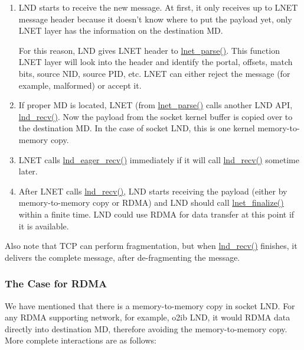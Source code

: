 \begin{enumerate}

\item LND starts to receive the new message. At first, it only receives up to LNET
message header because it doesn't know where to put the payload yet, only LNET
layer has the information on the destination MD.

For this reason, LND gives LNET header to \url{lnet_parse()}. This function
LNET layer will look into the header and identify the portal, offsets,
match bits, source NID, source PID, etc. LNET can either reject the message (for
example, malformed) or accept it.

\item If proper MD is located, LNET (from \url{lnet_parse()} calls another
LND API,  \url{lnd_recv()}. Now the payload from the socket kernel buffer is copied
over to the destination MD. In the case of socket LND, this is one kernel
memory-to-memory copy.
 

\item LNET calls \url{lnd_eager_recv()} immediately if it will call \url{lnd_recv()}
sometime later.

\item After LNET calls \url{lnd_recv()}, LND starts receiving the payload
(either by memory-to-memory copy or RDMA) and LND should call
\url{lnet_finalize()} within a finite time. LND could use RDMA for data
transfer at this point if it is available.

\end{enumerate}

Also note that TCP can perform fragmentation, but when \url{lnd_recv()}
finishes, it delivers the complete message, after de-fragmenting the message.

\subsubsection{The Case for RDMA}

We have mentioned that there is a memory-to-memory copy in socket LND. For any
RDMA supporting network, for example, o2ib LND, it would RDMA data directly
into destination MD, therefore avoiding the memory-to-memory copy. More complete
interactions are as follows:

